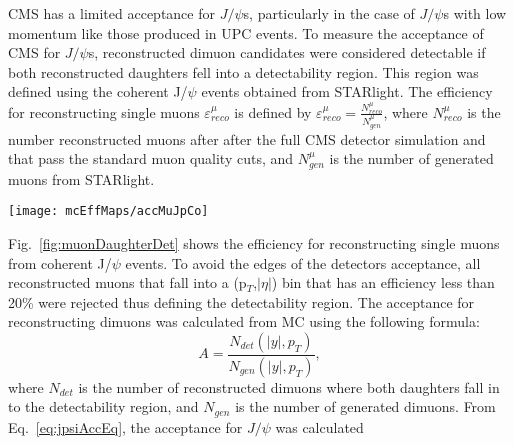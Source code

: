       CMS has a limited acceptance for $J/\psi$s, particularly in the case of 
        $J/\psi$s with low momentum like those produced in UPC events. 
      To measure the acceptance of CMS for $J/\psi$s, reconstructed dimuon 
        candidates were considered detectable if both reconstructed daughters 
        fell into a detectability region.
      This region was defined using the coherent J/$\psi$ events obtained from 
        STARlight.
      The efficiency for reconstructing single muons $\varepsilon^{\mu}_{reco}$ 
        is defined by $\varepsilon^{\mu}_{reco} = \frac{N^{\mu}_{reco}}{N^{\mu}_{gen}}$, 
        where $N^{\mu}_{reco}$ is the number reconstructed muons after 
        after the full CMS detector simulation and that pass the standard
        muon quality cuts, and $N^{\mu}_{gen}$ is the number of generated 
        muons from STARlight.
      \begin{figure*}[!Hhtb]
        \centering
          \texttt{[image: mcEffMaps/accMuJpCo]} %
        \caption{ Muon daughter detectability from coherent J/$\psi$, 
          incoherent J/$\psi$, photon-photon, and J/$\psi$ gun samples.}
        \label{fig:muonDaughterDet}
      \end{figure*}
      Fig.~\ref{fig:muonDaughterDet} shows the efficiency for reconstructing
        single muons from coherent J/$\psi$ events.
      To avoid the edges of the detectors acceptance, all reconstructed muons 
        that fall into a (p$_{T}$,$|\eta|$) bin that has an efficiency less 
        than 20\% were rejected thus defining the detectability region.
      The acceptance for reconstructing dimuons was calculated from MC
        using the following formula:
      \begin{equation}
        A=\frac{N_{det}(|y|,p_{T})}{N_{gen}(|y|,p_{T})},
        \label{eq:jpsiAccEq}
      \end{equation}
        where $N_{det}$ is the number of reconstructed dimuons where both 
        daughters fall in to the detectability region, and $N_{gen}$ is the
        number of generated dimuons. 
      From Eq.~\ref{eq:jpsiAccEq}, the acceptance for $J/\psi$ was calculated
